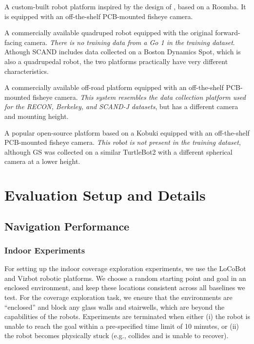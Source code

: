 \vspace{1mm}
 A custom-built robot platform inspired by the design of \citet{niwa2022spatio}, based on a Roomba. It is equipped with an off-the-shelf PCB-mounted fisheye camera.%


\vspace{1mm}
 A commercially available quadruped robot equipped with the original forward-facing camera. \emph{There is no training data from a Go 1 in the training dataset}. Athough SCAND includes data collected on a Boston Dynamics Spot, which is also a quadrupedal robot, the two platforms practically have very different characteristics.

\vspace{1mm}
 A commercially available off-road platform equipped with an off-the-shelf PCB-mounted fisheye camera. \emph{This system resembles the data collection platform used for the RECON, Berkeley, and SCAND-J datasets}, but has a different camera and mounting height.

\vspace{1mm}
 A popular open-source platform based on a Kobuki equipped with an off-the-shelf PCB-mounted fisheye camera. \emph{This robot is not present in the training dataset}, although GS was collected on a similar TurtleBot2 with a different spherical camera at a lower height.



\section{Evaluation Setup and Details}
\label{sec:app:evaluation}

\subsection{Navigation Performance}
\label{sec:app:evaluation_real}




\subsubsection{Indoor Experiments}

For setting up the indoor coverage exploration experiments, we use the LoCoBot and Vizbot robotic platforms. We choose a random starting point and goal in an enclosed environment, and keep these locations consistent across all baselines we test. For the coverage exploration task, we ensure that the environments are ``enclosed'' and block any glass walls and stairwells, which are beyond the capabilities of the robots. Experiments are terminated when either (i) the robot is unable to reach the goal within a pre-specified time limit of 10 minutes, or (ii) the robot becomes physically stuck (e.g., collides and is unable to recover).

